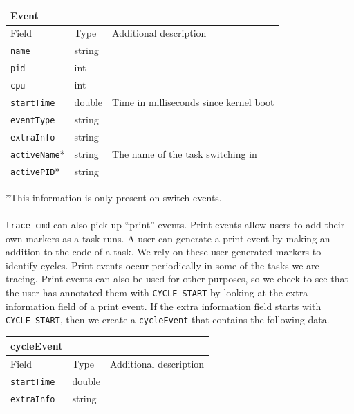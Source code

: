 \documentclass{hmcclinic}
\begin{document}
  \begin{center}
    \begin{tabular}{lll}
      \toprule
      Event      &        &                                        \\
      \midrule
      Field     & Type   & Additional description                 \\
      \midrule
       \texttt{name}      & string &                                        \\
       \texttt{pid}       & int    &                                        \\
       \texttt{cpu}       & int    &                                        \\
       \texttt{startTime} & double & Time in milliseconds since kernel boot \\
       \texttt{eventType} & string &                                        \\
      \texttt{extraInfo} & string &                                        \\
       \texttt{activeName}* & string & The name of the task switching in      \\
       \texttt{activePID}*  & string &                                        \\
      \bottomrule
    \end{tabular}
  \end{center}

  *This information is only present on switch events.\\\\

  \texttt{trace-cmd} can also pick up ``print'' events. Print events allow users to add
  their own markers as a task runs. A user can generate a print event by making
  an addition to the code of a task. We rely on these user-generated markers to
  identify cycles. Print events occur periodically in some of the tasks we are
  tracing. Print events can also be used for other purposes, so we check to see
  that the user has annotated them with \texttt{CYCLE\_START} by looking at the extra
  information field of a print event. If the extra information field starts with
  \texttt{CYCLE\_START}, then we create a \texttt{cycleEvent} that contains the following data.

  \begin{center}
    \begin{tabular}{lll}
      \toprule
      cycleEvent      &        &                                        \\
      \midrule
      Field     & Type   & Additional description                 \\
      \midrule
       \texttt{startTime}      & double &                                        \\
       \texttt{extraInfo}       & string    &                                        \\
      \bottomrule
    \end{tabular}
  \end{center}
\end{document}
